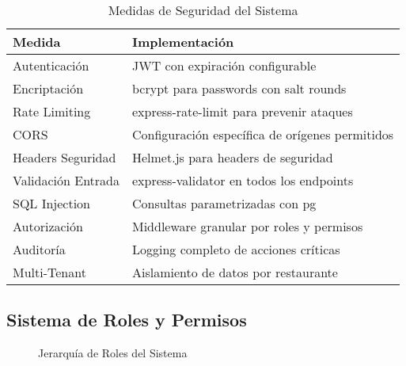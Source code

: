\documentclass[12pt,a4paper]{article}
\begin{document}
\begin{table}[H]
\centering
\begin{tabular}{@{}lp{8cm}@{}}
\toprule
\textbf{Medida} & \textbf{Implementación} \\
\midrule
Autenticación & JWT con expiración configurable \\
Encriptación & bcrypt para passwords con salt rounds \\
Rate Limiting & express-rate-limit para prevenir ataques \\
CORS & Configuración específica de orígenes permitidos \\
Headers Seguridad & Helmet.js para headers de seguridad \\
Validación Entrada & express-validator en todos los endpoints \\
SQL Injection & Consultas parametrizadas con pg \\
Autorización & Middleware granular por roles y permisos \\
Auditoría & Logging completo de acciones críticas \\
Multi-Tenant & Aislamiento de datos por restaurante \\
\bottomrule
\end{tabular}
\caption{Medidas de Seguridad del Sistema}
\end{table}

\subsection{Sistema de Roles y Permisos}

\begin{figure}[H]
\centering
{}
\caption{Jerarquía de Roles del Sistema}
\end{figure}
\end{document}
